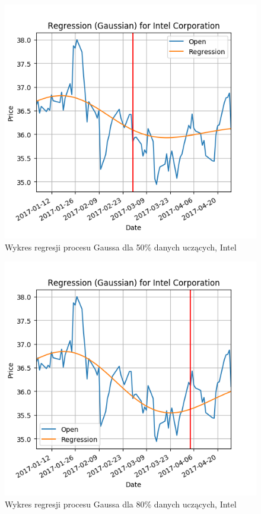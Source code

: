 \begin{figure}[h!]
\centering
\includegraphics[width=150mm]{pictures/plots/intel_gpr_50.png}
\caption{Wykres regresji procesu Gaussa dla 50\% danych uczących, Intel}
\label{fig:Wykres regresji procesu Gaussa dla 50\% danych uczących, Intel}
\end{figure}

\begin{figure}[h!]
\centering
\includegraphics[width=150mm]{pictures/plots/intel_gpr_80.png}
\caption{Wykres regresji procesu Gaussa dla 80\% danych uczących, Intel}
\label{fig:Wykres regresji procesu Gaussa dla 80\% danych uczących, Intel}
\end{figure}

